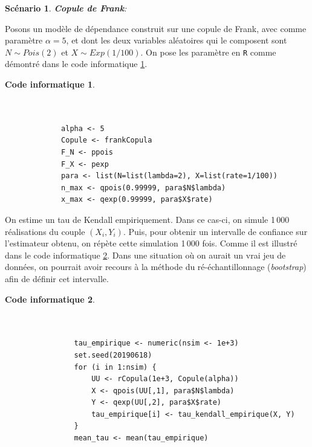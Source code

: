 \documentclass{article}
\newtheorem{code}{Code informatique}
\newtheorem{scenario}{Scénario}
\begin{document}
	 \clearpage
	 \begin{scenario}
	 	\textbf{Copule de Frank}:
	 	\label{scenario_Frank}
	 \end{scenario}
 	 Posons un modèle de dépendance construit sur une copule de Frank, avec comme paramètre $\alpha = 5$, et dont les deux variables aléatoires qui le composent sont $N \sim Pois(2)$ et $X\sim Exp(1/100)$. 
 	 On pose les paramètre en \texttt{R} comme démontré dans le code informatique \ref{code_parametres}. \\
 	 
	 \begin{minipage}[H]{\linewidth}
 	 	\begin{code}\label{code_parametres}
	 	 \begin{verbatim}
	 	 
	 	 
		 	 alpha <- 5
		 	 Copule <- frankCopula
		 	 F_N <- ppois
		 	 F_X <- pexp
		 	 para <- list(N=list(lambda=2), X=list(rate=1/100))
		 	 n_max <- qpois(0.99999, para$N$lambda)
		 	 x_max <- qexp(0.99999, para$X$rate)
	 	 \end{verbatim}
	 	\end{code}
 	\end{minipage}

 	On estime un tau de Kendall empiriquement. Dans ce cas-ci, on simule 1\,000 réalisations du couple $(X_i, Y_i)$. Puis, pour obtenir un intervalle de confiance sur l'estimateur obtenu, on répète cette simulation 1\,000 fois. Comme il est illustré dans le code informatique \ref{code_simul}. Dans une situation où on aurait un vrai jeu de données, on pourrait avoir recours à la méthode du ré-échantillonnage (\textit{bootstrap}) afin de définir cet intervalle. \\

	 \begin{minipage}[H]{\linewidth}
 	 	 	\begin{code}\label{code_simul}
	 		\begin{verbatim}
	 		
	 		
				tau_empirique <- numeric(nsim <- 1e+3)
				set.seed(20190618)
				for (i in 1:nsim) {
				    UU <- rCopula(1e+3, Copule(alpha))
				    X <- qpois(UU[,1], para$N$lambda)
				    Y <- qexp(UU[,2], para$X$rate)
				    tau_empirique[i] <- tau_kendall_empirique(X, Y)
				}
				mean_tau <- mean(tau_empirique)
	 		\end{verbatim}
 			\end{code}
 	\end{minipage}
\end{document}
